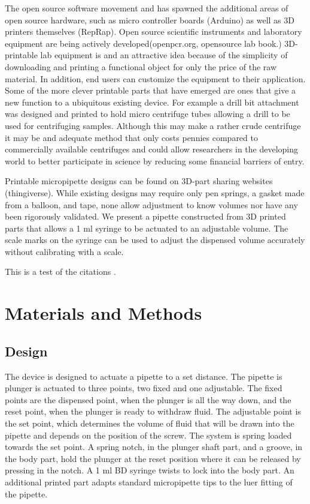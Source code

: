 The open source software movement and has spawned the additional areas of open source hardware, such as micro controller boards (Arduino) as well as 3D printers themselves (RepRap).
Open source scientific instruments and laboratory equipment are being actively developed(openpcr.org, opensource lab book.)
3D-printable lab equipment is and an attractive idea because of the simplicity of downloading and printing a functional object for only the price of the raw material. 
In addition, end users can customize the equipment to their application. 
Some of the more clever printable parts that have emerged are ones that give a new function to a ubiquitous existing device.
For example a drill bit attachment was designed and printed to hold micro centrifuge tubes allowing a drill to be used for centrifuging samples. 
Although this may make a rather crude centrifuge it may be and adequate method that only costs pennies compared to commercially available centrifuges and could allow researchers in the developing world to better participate in science by reducing some financial barriers of entry.

Printable micropipette designs can be found on 3D-part sharing websites (thingiverse).
While existing designs may require only pen springs, a gasket made from a balloon, and tape, none allow adjustment to know volumes nor have any been rigorously validated.
We present a pipette constructed from 3D printed parts that allows a 1 ml syringe to be actuated to an adjustable volume.
The scale marks on the syringe can be used to adjust the dispensed volume accurately without calibrating with a scale.



This is a test of the citations \cite{oppegard2010}.


\section*{Materials and Methods}
\subsection*{Design}
The device is designed to actuate a pipette to a set distance.
The pipette is plunger is actuated to three points, two fixed and one adjustable.
The fixed points are the dispensed point, when the plunger is all the way down, and the reset point, when the plunger is ready to withdraw fluid.
The adjustable point is the set point, which determines the volume of fluid that will be drawn into the pipette and depends on the position of the screw.
The system is spring loaded towards the set point.
A spring notch, in the plunger shaft part, and a groove, in the body part, hold the plunger at the reset position where it can be released by pressing in the notch.
A 1 ml BD syringe twists to lock into the body part.
An additional printed part adapts standard micropipette tips to the luer fitting of the pipette.


